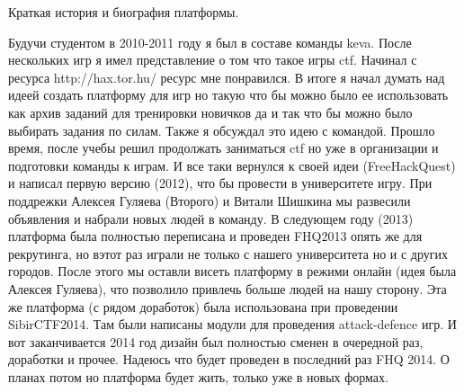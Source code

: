 
Краткая история и биография платформы.
\par
Будучи студентом в 2010-2011 году я был в составе команды keva.
После нескольких игр я имел представление о том что такое игры ctf.
Начинал с ресурса http://hax.tor.hu/ ресурс мне понравился.
В итоге я начал думать над идеей создать платформу для игр но такую что бы можно было
ее использовать как архив заданий для тренировки новичков да и так что бы можно было выбирать задания по силам.
Также я обсуждал это идею с командой. Прошло время, после учебы решил продолжать заниматься ctf но уже в организации и подготовки команды к играм.
И все таки вернулся к своей идеи (FreeHackQuest) и написал первую версию (2012), что бы провести в университете игру.
При поддрежки Алексея Гуляева (Второго) и Витали Шишкина мы развесили объявления и набрали новых людей в команду.
В следующем году (2013) платформа была полностью переписана и проведен FHQ2013 опять же для рекрутинга, но вэтот раз играли не только с нашего университета но и с других городов.
После этого мы оставли висеть платформу в режими онлайн (идея была Алексея Гуляева), что позволило привлечь больше людей на нашу сторону.
Эта же платформа (с рядом доработок) была использована при проведении SibirCTF2014. Там были написаны модули для проведения attack-defence игр.
И вот заканчивается 2014 год дизайн был полностью сменен в очередной раз, доработки и прочее. Надеюсь что будет проведен в последний раз FHQ 2014. 
О планах потом но платформа будет жить, только уже в новых формах.


